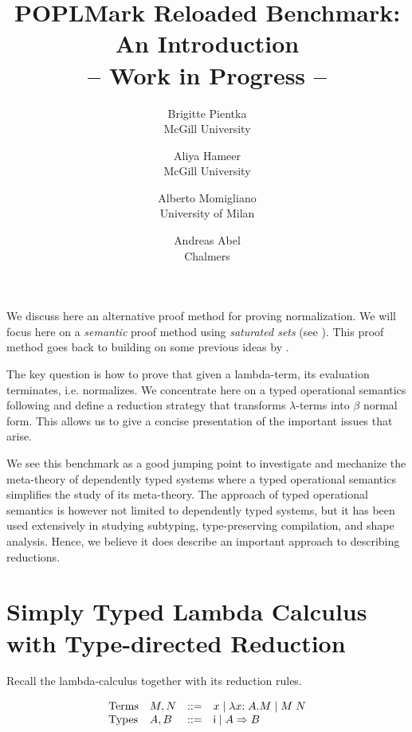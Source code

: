 \documentclass{article}
\begin{document}
\title{POPLMark Reloaded Benchmark: An Introduction \\
-- Work in Progress --}
\author{%
Brigitte Pientka \\ McGill University%
  \and Aliya Hameer \\ McGill University%
  \and Alberto Momigliano \\ University of Milan%
  \and Andreas Abel \\ Chalmers %
%
  }
\date{}
\maketitle

We discuss here an alternative proof method for proving
normalization. We will focus here on a \emph{semantic} proof method
using \emph{saturated sets} (see \cite{Luo:PHD90}). This proof method
goes back to \cite{Girard1972} building on some previous ideas
by \cite{Tait67}.

The key question is how to prove that given a lambda-term, its
evaluation terminates, i.e. normalizes. We concentrate here on a typed
operational semantics following \cite{Goguen:TLCA95} and define
a reduction strategy that transforms $\lambda$-terms into
$\beta$ normal form. This allows us to give a concise presentation of the important issues that arise.

 We see this benchmark as a good jumping point to investigate and mechanize the meta-theory of dependently typed systems where a typed operational semantics simplifies the study of its meta-theory. The approach of typed operational semantics is however not limited to dependently typed systems, but it has been used extensively in studying subtyping,  type-preserving compilation, and shape analysis. Hence, we believe it does describe an important approach to describing reductions.



\section{Simply Typed Lambda Calculus with Type-directed Reduction}
Recall the lambda-calculus together with its reduction rules.


\[
\begin{array}{llcl}
\mbox{Terms}  & M,N & \mathrel{::=} & x \mid \lambda x{:A}. M \mid M\;N \\
\mbox{Types} & A, B & \mathrel{::=} & \textsf{i} \mid A \Rightarrow B
\end{array}
\]
\end{document}
